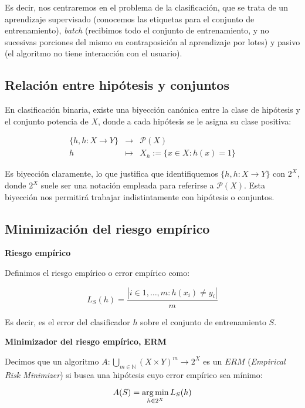 Es decir, nos centraremos en el problema de la clasificación, que se trata de un aprendizaje supervisado (conocemos las etiquetas para
el conjunto de entrenamiento), \emph{batch} (recibimos todo el conjunto de entrenamiento, y no sucesivas porciones del mismo en
contraposición al aprendizaje por lotes) y pasivo (el algoritmo no tiene interacción con el usuario).

\subsection{Relación entre hipótesis y conjuntos}
En clasificación binaria, existe una biyección canónica entre la clase de hipótesis y el conjunto potencia de $X$, donde
a cada hipótesis se le asigna su clase positiva:

\begin{equation}
 \begin{array}{rcl} 
  \{h, h:X \rightarrow Y\} & \longrightarrow & \mathcal{P}(X) \\
  h & \longmapsto & X_h := \{x\in X: h(x) = 1\}
 \end{array}
 \label{sec:hip-con} 
\end{equation}

Es biyección claramente, lo que justifica que identifiquemos $\{h, h:X \rightarrow Y\}$ con $2^X$, donde $2^X$ suele ser una notación
empleada para referirse a $\mathcal{P}(X)$. Esta biyección nos permitirá trabajar indistintamente con hipótesis o conjuntos.

\subsection{Minimización del riesgo empírico}

\begin{definition} \textbf{Riesgo empírico}

Definimos el riesgo empírico o error empírico como:

\[L_S(h) = \frac{|i\in {1,\ldots, m}: h(x_i) \neq y_i|}{m}\]

\end{definition}

Es decir, es el error del clasificador $h$ sobre el conjunto de entrenamiento $S$. 

\begin{definition} \textbf{Minimizador del riesgo empírico, ERM}

Decimos que un algoritmo $A: \underset{m\in \mathbb{N}}{\bigcup} (X\times Y)^m \rightarrow 2^{X}$ es un $ERM$ 
(\emph{Empirical Risk Minimizer}) si busca una hipótesis cuyo error empírico sea mínimo:

\[A(S) = \operatorname*{arg\,min}_{h\in 2^X} L_S(h)\]
\end{definition}

